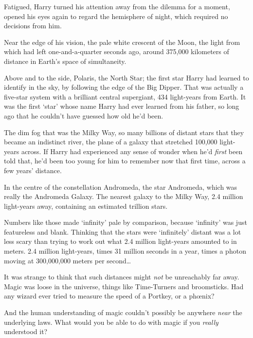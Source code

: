 Fatigued, Harry turned his attention away from the dilemma for a moment, opened his eyes again to regard the hemisphere of night, which required no decisions from him.

Near the edge of his vision, the pale white crescent of the Moon, the light from which had left one-and-a-quarter seconds ago, around 375,000 kilometers of distance in Earth's space of simultaneity.

Above and to the side, Polaris, the North Star; the first star Harry had learned to identify in the sky, by following the edge of the Big Dipper. That was actually a five-star system with a brilliant central supergiant, 434 light-years from Earth. It was the first `star' whose name Harry had ever learned from his father, so long ago that he couldn't have guessed how old he'd been.

The dim fog that was the Milky Way, so many billions of distant stars that they became an indistinct river, the plane of a galaxy that stretched 100,000 light-years across. If Harry had experienced any sense of wonder when he'd \emph{first} been told that, he'd been too young for him to remember now that first time, across a few years' distance.

In the centre of the constellation Andromeda, the star Andromeda, which was really the Andromeda Galaxy. The nearest galaxy to the Milky Way, 2.4 million light-years away, containing an estimated trillion stars.

Numbers like those made `infinity' pale by comparison, because `infinity' was just featureless and blank. Thinking that the stars were `infinitely' distant was a lot less scary than trying to work out what 2.4 million light-years amounted to in meters. 2.4 million light-years, times 31 million seconds in a year, times a photon moving at 300,000,000 meters per second{\ldots}

It was strange to think that such distances might \emph{not} be unreachably far away. Magic was loose in the universe, things like Time-Turners and broomsticks. Had any wizard ever tried to measure the speed of a Portkey, or a phœnix?

And the human understanding of magic couldn't possibly be anywhere \emph{near} the underlying laws. What would you be able to do with magic if you \emph{really} understood it?

